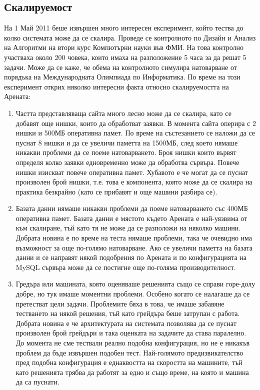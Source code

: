 \documentclass[a4paper,12pt]{article}
\begin{document}
  \subsection{Скалируемост}
  
  На 1 Май 2011 беше извършен много интересен експеримент, който тества до колко системата може да се скалира. Проведе се контролното по Дизайн и Анализ на Алгоритми на втори курс Компютърни науки във ФМИ. На това контролно участваха около 200 човека, които имаха на разположение 5 часа за да решат 5 задачи. Може да се каже, че обема на контролното симулира натоварване от порядъка на Международната Олимпиада по Информатика. По време на този експеримент открих няколко интересни факта относно скалируемостта на Арената:
  
  \begin{enumerate}
    \item Частта представляваща сайта много лесно може да се скалира, като се добавят още нишки, които да обработват заявки. В момента сайта оперира с 2 нишки и 500МБ оперативна памет. По време на състезанието се наложи да се пуснат 8 нишки и да се увеличи паметта на 1500МБ, след което нямаше никакви проблеми да се поеме натоварването. Броя нишки които вървят определя колко заявки едновременно може да обработва сървъра. Повече нишки изискват повече оперативна памет. Хубавото е че могат да се пуснат произволен брой нишки, т.е. това е компонента, която може да се скалира на практика безкрайно (като се прибавят и още машини разбира се).
    \item Базата данни нямаше никакви проблеми да поеме натоварването със 400МБ оперативна памет. Базата данни е мястото където Арената е най-уязвима от към скалиране, тъй като тя не може да се разположи на няколко машини. Добрата новина е по време на теста нямаше проблеми, така че очевидно има възможност за още по-голямо натоварване. Ако се увеличи паметта на базата данни и се направят някой подобрения по Арената и по конфигурацията на MySQL сървъра може да се постигне още по-голяма производителност.
    \item Гредъра или машината, която оценяваше решенията също се справи горе-долу добре, но тук имаше моментни проблеми. Особено когато се налагаше да се претестват цели задачи. Проблемите бяха в това, че имаше забавяне тестването на някой решения, тъй като грейдъра беше затрупан с работа. Добрата новина е че архитектурата на системата позволява да се пуснат произволен брой грейдъри и така оценката на задачите да става паралелно. До момента не сме тествали реално подобна конфигурация, но не е никакъв проблем да бъде извършен подобен тест. Най-голямото предизвикателство пред подобна конфигурация е еднаквостта на скоростта на машините, тъй като решенията трябва да работят за едно и също време, на която и машина да са пуснати.
  \end{enumerate}
  
\end{document}
